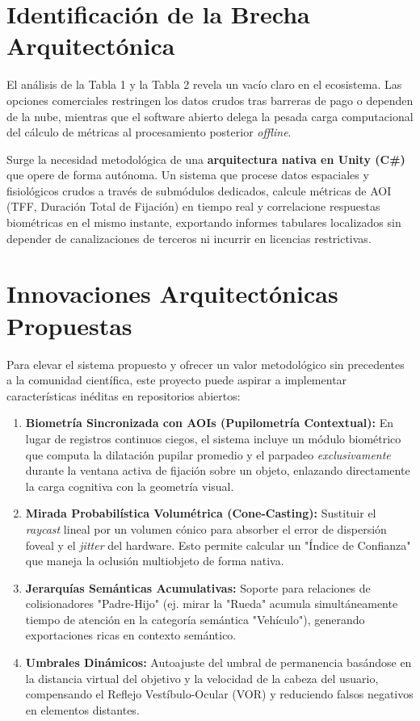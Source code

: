 \documentclass[12pt,a4paper]{article}
\begin{document}
\section{Identificación de la Brecha Arquitectónica}

El análisis de la Tabla 1 y la Tabla 2 revela un vacío claro en el ecosistema. Las opciones comerciales restringen los datos crudos tras barreras de pago o dependen de la nube, mientras que el software abierto delega la pesada carga computacional del cálculo de métricas al procesamiento posterior \textit{offline}.

Surge la necesidad metodológica de una \textbf{arquitectura nativa en Unity (C\#)} que opere de forma autónoma. Un sistema que procese datos espaciales y fisiológicos crudos a través de submódulos dedicados, calcule métricas de AOI (TFF, Duración Total de Fijación) en tiempo real y correlacione respuestas biométricas en el mismo instante, exportando informes tabulares localizados sin depender de canalizaciones de terceros ni incurrir en licencias restrictivas.

\section{Innovaciones Arquitectónicas Propuestas}

Para elevar el sistema propuesto y ofrecer un valor metodológico sin precedentes a la comunidad científica, este proyecto puede aspirar a implementar características inéditas en repositorios abiertos:

\begin{enumerate}
    \item \textbf{Biometría Sincronizada con AOIs (Pupilometría Contextual):} En lugar de registros continuos ciegos, el sistema incluye un módulo biométrico que computa la dilatación pupilar promedio y el parpadeo \textit{exclusivamente} durante la ventana activa de fijación sobre un objeto, enlazando directamente la carga cognitiva con la geometría visual.
    \item \textbf{Mirada Probabilística Volumétrica (Cone-Casting):} Sustituir el \textit{raycast} lineal por un volumen cónico para absorber el error de dispersión foveal y el \textit{jitter} del hardware. Esto permite calcular un "Índice de Confianza" que maneja la oclusión multiobjeto de forma nativa.
    \item \textbf{Jerarquías Semánticas Acumulativas:} Soporte para relaciones de colisionadores "Padre-Hijo" (ej. mirar la "Rueda" acumula simultáneamente tiempo de atención en la categoría semántica "Vehículo"), generando exportaciones ricas en contexto semántico.
    \item \textbf{Umbrales Dinámicos:} Autoajuste del umbral de permanencia basándose en la distancia virtual del objetivo y la velocidad de la cabeza del usuario, compensando el Reflejo Vestíbulo-Ocular (VOR) y reduciendo falsos negativos en elementos distantes.
\end{enumerate}
\end{document}
